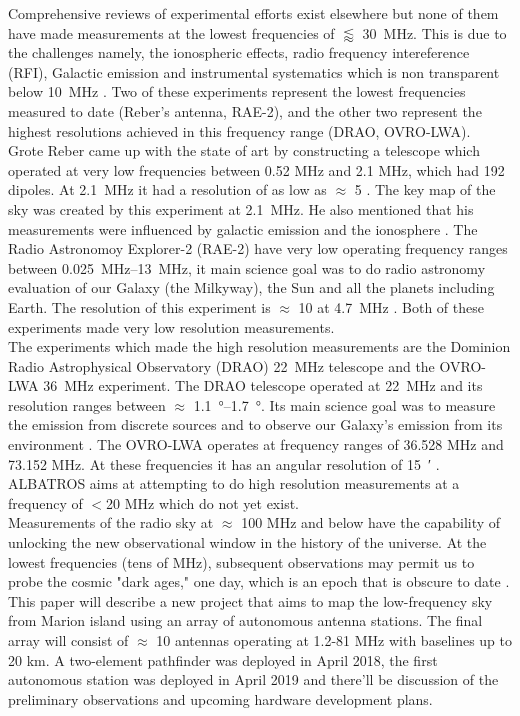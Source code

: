 \documentclass{ws-jai}
\begin{document}
Comprehensive reviews of experimental efforts exist elsewhere but none of them have made measurements at the lowest frequencies of $\lessapprox$ \SI{30}{\MHz}. This is due to the challenges namely, the ionospheric effects, radio frequency intereference (RFI), Galactic emission and instrumental systematics which is non transparent below \SI{10}{\MHz} \cite{2019JAI.....850004P}. Two of these experiments represent the lowest frequencies measured to date (Reber’s antenna, RAE-2), and the other two represent the highest resolutions achieved in this frequency range (DRAO, OVRO-LWA).\\

Grote Reber came up with the state of art by constructing a telescope which operated at very low frequencies between 0.52 MHz and 2.1 MHz, which had 192 dipoles. At \SI{2.1}{\MHz} it had a resolution of as low as $\approx$ 5 \degree. The key map of the sky was created by this experiment at \SI{2.1}{\MHz}. He also mentioned that his measurements were influenced by galactic emission and the ionosphere \cite{article, 1988A&A...195..372W}. The Radio Astronomoy Explorer-2 (RAE-2) have very low operating frequency ranges between \SIrange{0.025}{13}{\MHz}, it main science goal was to do radio astronomy evaluation of our Galaxy (the Milkyway), the Sun and all the planets including Earth. The resolution of this experiment is $\approx$ 10 \degree at \SI{4.7}{\MHz} \cite{1975A&A....40..365A}. Both of these experiments made very low resolution measurements.\\


The experiments which made the high resolution measurements are the  Dominion Radio Astrophysical Observatory (DRAO) \SI{22}{\MHz} telescope and the OVRO-LWA \SI{36}{\MHz} experiment. The DRAO telescope operated at \SI{22}{\MHz} and its resolution ranges between $\approx$ \SIrange{1.1}{1.7}{\degree}. Its main science goal was to measure the emission from discrete sources and to observe our Galaxy's emission from its environment \cite{1999A&AS..137....7R}. The OVRO-LWA operates at frequency ranges of 36.528 MHz and 73.152 MHz. At these frequencies it has an angular resolution of \SI{15}{\arcminute} \cite{2018AJ....156...32E}. ALBATROS aims at attempting to do high resolution measurements at a frequency of $<$20 MHz which do not yet exist.\\
	
Measurements of the radio sky at $\approx$ 100 MHz and below have the capability of unlocking the new observational window in the history of the universe. At the lowest frequencies (tens of MHz), subsequent observations may permit us to probe the cosmic "dark ages," one day, which is an epoch that is obscure to date \cite{2019arXiv190710853C, 2019arXiv190804296K}. This paper will describe a new project that aims to map the low-frequency sky from Marion island using an array of autonomous antenna stations. The final array will consist of  $\approx$ 10 antennas operating at 1.2-81 MHz with baselines up to 20 km. A two-element pathfinder was deployed in April 2018, the first autonomous station was deployed in April 2019 and there'll be discussion of the preliminary observations and upcoming hardware development plans.
\end{document}

